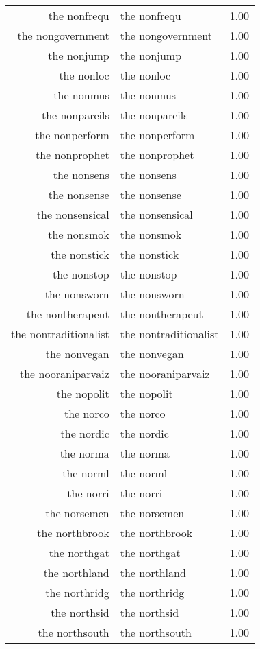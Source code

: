 \begin{table}[ht]
\begin{tabular}{rlr}
  the nonfrequ & the nonfrequ & 1.00 \\ 
  the nongovernment & the nongovernment & 1.00 \\ 
  the nonjump & the nonjump & 1.00 \\ 
  the nonloc & the nonloc & 1.00 \\ 
  the nonmus & the nonmus & 1.00 \\ 
  the nonpareils & the nonpareils & 1.00 \\ 
  the nonperform & the nonperform & 1.00 \\ 
  the nonprophet & the nonprophet & 1.00 \\ 
  the nonsens & the nonsens & 1.00 \\ 
  the nonsense & the nonsense & 1.00 \\ 
  the nonsensical & the nonsensical & 1.00 \\ 
  the nonsmok & the nonsmok & 1.00 \\ 
  the nonstick & the nonstick & 1.00 \\ 
  the nonstop & the nonstop & 1.00 \\ 
  the nonsworn & the nonsworn & 1.00 \\ 
  the nontherapeut & the nontherapeut & 1.00 \\ 
  the nontraditionalist & the nontraditionalist & 1.00 \\ 
  the nonvegan & the nonvegan & 1.00 \\ 
  the nooraniparvaiz & the nooraniparvaiz & 1.00 \\ 
  the nopolit & the nopolit & 1.00 \\ 
  the norco & the norco & 1.00 \\ 
  the nordic & the nordic & 1.00 \\ 
  the norma & the norma & 1.00 \\ 
  the norml & the norml & 1.00 \\ 
  the norri & the norri & 1.00 \\ 
  the norsemen & the norsemen & 1.00 \\ 
  the northbrook & the northbrook & 1.00 \\ 
  the northgat & the northgat & 1.00 \\ 
  the northland & the northland & 1.00 \\ 
  the northridg & the northridg & 1.00 \\ 
  the northsid & the northsid & 1.00 \\ 
  the northsouth & the northsouth & 1.00 \\ 

\end{tabular}
\end{table}
